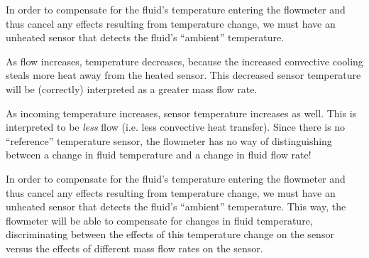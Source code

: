 \vskip 10pt

In order to compensate for the fluid's temperature entering the flowmeter and thus cancel any effects resulting from temperature change, we must have an unheated sensor that detects the fluid's ``ambient'' temperature.







As flow increases, temperature decreases, because the increased convective cooling steals more heat away from the heated sensor.  This decreased sensor temperature will be (correctly) interpreted as a greater mass flow rate.

\vskip 10pt

As incoming temperature increases, sensor temperature increases as well.  This is interpreted to be {\it less} flow (i.e. less convective heat transfer).  Since there is no ``reference'' temperature sensor, the flowmeter has no way of distinguishing between a change in fluid temperature and a change in fluid flow rate!

\vskip 10pt

In order to compensate for the fluid's temperature entering the flowmeter and thus cancel any effects resulting from temperature change, we must have an unheated sensor that detects the fluid's ``ambient'' temperature.  This way, the flowmeter will be able to compensate for changes in fluid temperature, discriminating between the effects of this temperature change on the sensor versus the effects of different mass flow rates on the sensor.





